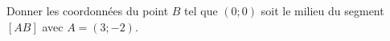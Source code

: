 
\begin{exercice}\label{exoSeconde-0056}

    Donner les coordonnées du point \( B\) tel que \( (0;0)\) soit le milieu du segment \( [AB]\) avec \( A=(3;-2)\).

\end{exercice}
